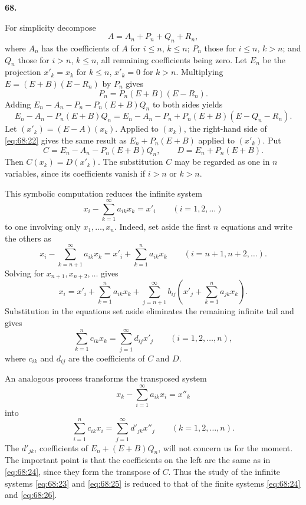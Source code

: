\documentclass[
  paper=b5,
  fontsize=13pt,
  twoside=true,
  open=any,
  bookmarkpackage=false,
  chapterprefix=true,
  headings=normal
]{scrbook}
\theoremstyle{definition}
\newcommand{\numberedparagraph}[1]{%
  \par\medskip\phantomsection\label{sec:#1}%
  \noindent\textbf{#1.}\enspace
}
\begin{document}
\numberedparagraph{68}
For simplicity decompose
\[
  A=A_n+P_n+Q_n+R_n,
\]
where $A_n$ has the coefficients of $A$ for $i\leq n$, $k\leq n$;
$P_n$ those for $i\leq n$, $k>n$; and $Q_n$ those for $i>n$, $k\leq n$,
all remaining coefficients being zero. Let $E_n$ be the projection
$x'_k=x_k$ for $k\leq n$, $x'_k=0$ for $k>n$. Multiplying
$E=(E+B)(E-R_n)$ by $P_n$ gives
\[
  P_n=P_n(E+B)(E-R_n).
\]
Adding $E_n-A_n-P_n-P_n(E+B)Q_n$ to both sides yields
\begin{equation}
 E_n-A_n-P_n(E+B)Q_n
 =E_n-A_n-P_n+P_n(E+B)(E-Q_n-R_n).
 \tag{22}\label{eq:68:22}
\end{equation}
Let $(x'_k)=(E-A)(x_k)$. Applied to $(x_k)$, the right-hand side of
\eqref{eq:68:22} gives the same result as
$E_n+P_n(E+B)$ applied to $(x'_k)$. Put
\[
 C=E_n-A_n-P_n(E+B)Q_n,
 \qquad
 D=E_n+P_n(E+B).
\]
Then $C(x_k)=D(x'_k)$. The substitution $C$ may be regarded as one in $n$
variables, since its coefficients vanish if $i>n$ or $k>n$.

This symbolic computation reduces the infinite system
\begin{equation}
 x_i-\sum_{k=1}^{\infty}a_{ik}x_k=x'_i
 \qquad(i=1,2,\ldots)
 \tag{23}\label{eq:68:23}
\end{equation}
to one involving only $x_1,\ldots,x_n$. Indeed, set aside the first $n$
equations and write the others as
\[
 x_i-\sum_{k=n+1}^{\infty}a_{ik}x_k
 =x'_i+\sum_{k=1}^{n}a_{ik}x_k
 \qquad(i=n+1,n+2,\ldots).
\]
Solving for $x_{n+1},x_{n+2},\ldots$ gives
\[
 x_i=x'_i+\sum_{k=1}^{n}a_{ik}x_k
 +\sum_{j=n+1}^{\infty}b_{ij}
   \left(x'_j+\sum_{k=1}^{n}a_{jk}x_k\right).
\]
Substitution in the equations set aside eliminates the remaining infinite
tail and gives
\begin{equation}
 \sum_{k=1}^{n}c_{ik}x_k
 =\sum_{j=1}^{\infty}d_{ij}x'_j
 \qquad(i=1,2,\ldots,n),
 \tag{24}\label{eq:68:24}
\end{equation}
where $c_{ik}$ and $d_{ij}$ are the coefficients of $C$ and $D$.

An analogous process transforms the transposed system
\begin{equation}
 x_k-\sum_{i=1}^{\infty}a_{ik}x_i=x''_k
 \tag{25}\label{eq:68:25}
\end{equation}
into
\begin{equation}
 \sum_{i=1}^{n}c_{ik}x_i
 =\sum_{j=1}^{\infty}d'_{jk}x''_j
 \qquad(k=1,2,\ldots,n).
 \tag{26}\label{eq:68:26}
\end{equation}
The $d'_{jk}$, coefficients of $E_n+(E+B)Q_n$, will not concern us for
the moment. The important point is that the coefficients on the left are
the same as in \eqref{eq:68:24}, since they form the transpose of $C$.
Thus the study of the infinite systems \eqref{eq:68:23} and
\eqref{eq:68:25} is reduced to that of the finite systems
\eqref{eq:68:24} and \eqref{eq:68:26}.
\end{document}
